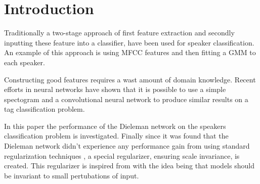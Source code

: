 \section{Introduction}

Traditionally a two-stage approach of first feature extraction and secondly inputting these feature into a classifier, have been used for speaker classification. An example of this approach is using MFCC features and then fitting a GMM to each speaker.

Constructing good features requires a wast amount of domain knowledge. Recent efforts  in neural networks\cite{dieleman} have shown that it is possible to use a simple spectogram and a convolutional neural network to produce similar results on a tag classification problem.

In this paper the performance of the Dieleman network\cite{dieleman} on the speakers classification problem is investigated. Finally since it was found that the Dieleman network didn't experience any performance gain from using standard regularization techniques \cite{dieleman}, a special regularizer, ensuring scale invariance, is created. This regularizer is inspired from \cite{scale-invariante} with the idea being that models should be invariant to small pertubations of input.

